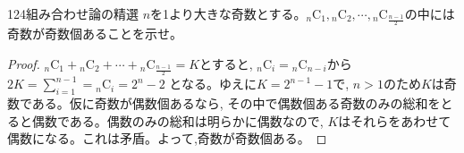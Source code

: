 \begin{prob}{124}{}{組み合わせ論の精選}
$n$を1より大きな奇数とする。${}_{n}\mbox{C}_1,{}_{n}\mbox{C}_2,\cdots, {}_{n}\mbox{C}_{\frac{n-1}{2}}$の中には奇数が奇数個あることを示せ。 
\end{prob}
\begin{proof}
${}_{n}\mbox{C}_1+{}_{n}\mbox{C}_2+\cdots +{}_{n}\mbox{C}_{\frac{n-1}{2}}=K$とすると, ${}_n\mbox{C}_i={}_n\mbox{C}_{n-i}$から $2K=\displaystyle\sum_{i=1}^{n-1}={}_n\mbox{C}_i =2^n-2$ となる。ゆえに$K=2^{n-1}-1$で, $n>1$のため$K$は奇数である。仮に奇数が偶数個あるなら, その中で偶数個ある奇数のみの総和をとると偶数である。偶数のみの総和は明らかに偶数なので, $K$はそれらをあわせて偶数になる。これは矛盾。よって,奇数が奇数個ある。
\end{proof}

